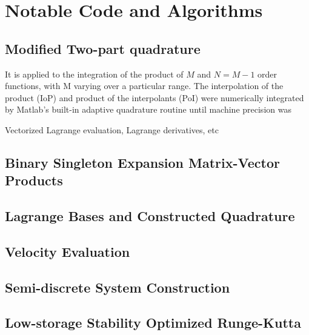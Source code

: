 \documentclass[letterpaper,12pt]{report}
\begin{document}
\chapter{Notable Code and Algorithms}\label{Algs}
\section{Modified Two-part quadrature}

It is applied to the integration of the product of $M$ and $N=M-1$ order functions, with M varying over a particular range. The interpolation of the product (IoP) and product of the interpolants (PoI) were numerically integrated by Matlab's built-in adaptive quadrature routine until machine precision was 

Vectorized Lagrange evaluation, Lagrange derivatives, etc
\newpage
\section{Binary Singleton Expansion Matrix-Vector Products}
\section{Lagrange Bases and Constructed Quadrature}
\newpage
\section{Velocity Evaluation}
\section{Semi-discrete System Construction}
\newpage
\section{Low-storage Stability Optimized Runge-Kutta}
\end{document}
